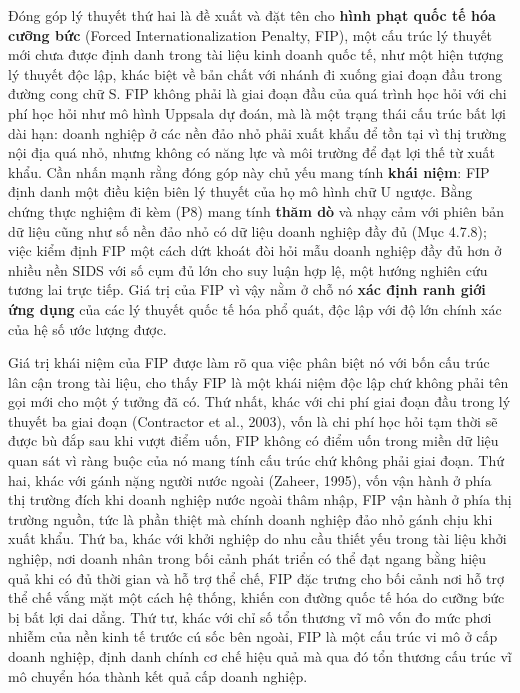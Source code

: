 \documentclass[
  a4paper,
  13pt]{extreport}
\begin{document}
Đóng góp lý thuyết thứ hai là đề xuất và đặt tên cho \textbf{hình phạt
quốc tế hóa cưỡng bức} (Forced Internationalization Penalty, FIP), một
cấu trúc lý thuyết mới chưa được định danh trong tài liệu kinh doanh
quốc tế, như một hiện tượng lý thuyết độc lập, khác biệt về bản chất với
nhánh đi xuống giai đoạn đầu trong đường cong chữ S. FIP không phải là
giai đoạn đầu của quá trình học hỏi với chi phí học hỏi như mô hình
Uppsala dự đoán, mà là một trạng thái cấu trúc bất lợi dài hạn: doanh
nghiệp ở các nền đảo nhỏ phải xuất khẩu để tồn tại vì thị trường nội địa
quá nhỏ, nhưng không có năng lực và môi trường để đạt lợi thế từ xuất
khẩu. Cần nhấn mạnh rằng đóng góp này chủ yếu mang tính \textbf{khái
niệm}: FIP định danh một điều kiện biên lý thuyết của họ mô hình chữ U
ngược. Bằng chứng thực nghiệm đi kèm (P8) mang tính \textbf{thăm dò} và
nhạy cảm với phiên bản dữ liệu cũng như số nền đảo nhỏ có dữ liệu doanh
nghiệp đầy đủ (Mục 4.7.8); việc kiểm định FIP một cách dứt khoát đòi hỏi
mẫu doanh nghiệp đầy đủ hơn ở nhiều nền SIDS với số cụm đủ lớn cho suy
luận hợp lệ, một hướng nghiên cứu tương lai trực tiếp. Giá trị của FIP
vì vậy nằm ở chỗ nó \textbf{xác định ranh giới ứng dụng} của các lý
thuyết quốc tế hóa phổ quát, độc lập với độ lớn chính xác của hệ số ước
lượng được.

Giá trị khái niệm của FIP được làm rõ qua việc phân biệt nó với bốn cấu
trúc lân cận trong tài liệu, cho thấy FIP là một khái niệm độc lập chứ
không phải tên gọi mới cho một ý tưởng đã có. Thứ nhất, khác với chi phí
giai đoạn đầu trong lý thuyết ba giai đoạn (Contractor et al., 2003),
vốn là chi phí học hỏi tạm thời sẽ được bù đắp sau khi vượt điểm uốn,
FIP không có điểm uốn trong miền dữ liệu quan sát vì ràng buộc của nó
mang tính cấu trúc chứ không phải giai đoạn. Thứ hai, khác với gánh nặng
người nước ngoài (Zaheer, 1995), vốn vận hành ở phía thị trường đích khi
doanh nghiệp nước ngoài thâm nhập, FIP vận hành ở phía thị trường nguồn,
tức là phần thiệt mà chính doanh nghiệp đảo nhỏ gánh chịu khi xuất khẩu.
Thứ ba, khác với khởi nghiệp do nhu cầu thiết yếu trong tài liệu khởi
nghiệp, nơi doanh nhân trong bối cảnh phát triển có thể đạt ngang bằng
hiệu quả khi có đủ thời gian và hỗ trợ thể chế, FIP đặc trưng cho bối
cảnh nơi hỗ trợ thể chế vắng mặt một cách hệ thống, khiến con đường quốc
tế hóa do cưỡng bức bị bất lợi dai dẳng. Thứ tư, khác với chỉ số tổn
thương vĩ mô vốn đo mức phơi nhiễm của nền kinh tế trước cú sốc bên
ngoài, FIP là một cấu trúc vi mô ở cấp doanh nghiệp, định danh chính cơ
chế hiệu quả mà qua đó tổn thương cấu trúc vĩ mô chuyển hóa thành kết
quả cấp doanh nghiệp.
\end{document}
